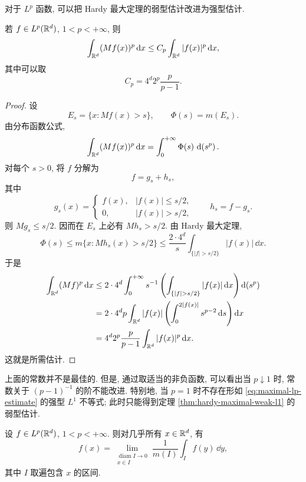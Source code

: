 对于 \(L^p\) 函数, 可以把 Hardy 最大定理的弱型估计改进为强型估计.

\begin{thm}[最大函数的 \(L^p\) 估计]
	\label{thm:maximal-lp-estimate}
	若 \(f\in L^p(\mathbb{R}^d)\), \(1<p<+\infty\), 则
	\begin{equation}
		\int_{\mathbb{R}^d}(Mf(x))^p\,\dd x
		\leq
		C_p\int_{\mathbb{R}^d}|f(x)|^p\,\dd x,
		\label{eq:maximal-lp-estimate}
	\end{equation}
	其中可以取
	\[
	C_p=4^d2^p\frac{p}{p-1}.
	\]
\end{thm}

\begin{proof}
	设
	\[
	E_s=\{x:Mf(x)>s\},
	\qquad
	\Phi(s)=m(E_s).
	\]
	由分布函数公式,
	\[
	\int_{\mathbb{R}^d}(Mf(x))^p\,\dd x
	=
	\int_0^{+\infty}\Phi(s)\,\dd(s^p).
	\]
	对每个 \(s>0\), 将 \(f\) 分解为
	\[
	f=g_s+h_s,
	\]
	其中
	\[
	g_s(x)=
	\begin{cases}
		f(x), & |f(x)|\leq s/2,\\
		0, & |f(x)|>s/2,
	\end{cases}
	\qquad
	h_s=f-g_s.
	\]
	则 \(Mg_s\leq s/2\). 因而在 \(E_s\) 上必有 \(Mh_s>s/2\). 由 Hardy 最大定理,
	\[
	\Phi(s)
	\leq
	m\{x:Mh_s(x)>s/2\}
	\leq
	\frac{2\cdot4^d}{s}\int_{\{|f|>s/2\}}|f(x)|\,\dd x.
	\]
	于是
	\begin{align*}
		\int_{\R^d}(Mf)^p\,\dd x
		&\leq
		2\cdot4^d\int_0^{+\infty}s^{-1}
		\left(\int_{\{|f|>s/2\}}|f(x)|\,\dd x\right)\dd(s^p)\\
		&=2\cdot4^d p
		\int_{\R^d}|f(x)|
		\left(\int_0^{2|f(x)|}s^{p-2}\,\dd s\right)\dd x\\
		&=4^d2^p\frac{p}{p-1}
		\int_{\R^d}|f(x)|^p\,\dd x.
	\end{align*}
	这就是所需估计.
\end{proof}

\begin{rem}
	上面的常数并不是最佳的. 但是, 通过取适当的非负函数, 可以看出当 \(p\downarrow1\) 时, 常数关于 \((p-1)^{-1}\) 的阶不能改进. 特别地, 当 \(p=1\) 时不存在形如 \eqref{eq:maximal-lp-estimate} 的强型 \(L^1\) 不等式; 此时只能得到定理 \ref{thm:hardy-maximal-weak-l1} 的弱型估计.
\end{rem}

\begin{thm}[区间基下的微分定理]
	\label{thm:lebesgue-differentiation-rectangles-lp}
	设 \(f\in L^p(\mathbb{R}^d)\), \(1<p<+\infty\). 则对几乎所有 \(x\in\mathbb{R}^d\), 有
	\begin{equation}
		f(x)=\lim_{\substack{\operatorname{diam} I\to0\\ x\in I}}
		\frac{1}{m(I)}\int_I f(y)\,\dd y,
		\label{eq:rectangle-differentiation-lp}
	\end{equation}
	其中 \(I\) 取遍包含 \(x\) 的区间.
\end{thm}

